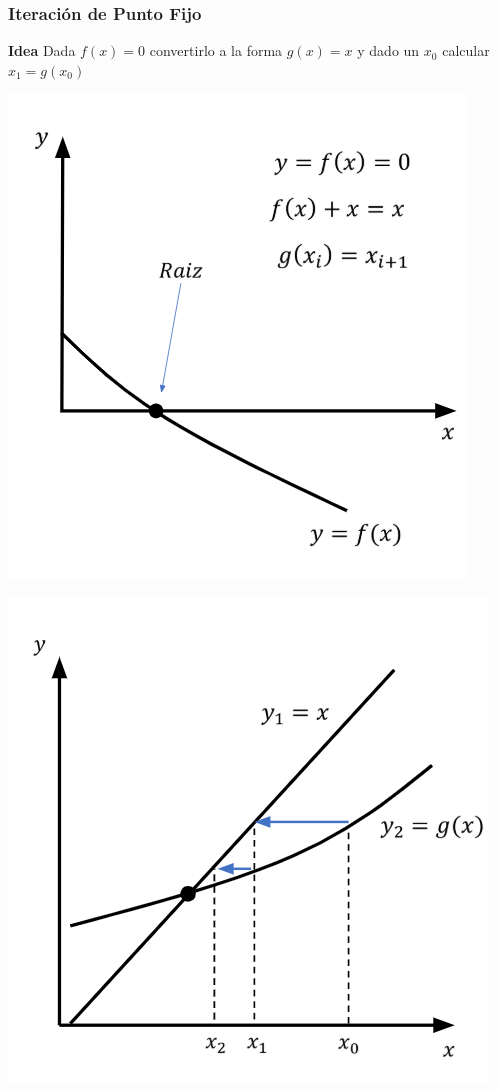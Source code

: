 \documentclass[xcolor=svgnames]{beamer} %
\theoremstyle{plain}
\renewcommand{\textbf}[1]{{\bfseries\textcolor{redUnq2}{#1}}}
\theoremstyle{definition}
\begin{document}
\begin{frame}
\frametitle{Iteración de Punto Fijo}

\begin{tcolorbox}
\textbf{Idea}
	Dada $f(x)=0$ convertirlo a la forma $g(x) = x$ y dado un $x_0$
	calcular $x_1 = g(x_0)$

\end{tcolorbox}
\begin{minipage}{.45\linewidth}
\includegraphics[width=\linewidth]{FixedPoint/fixed1.PNG} 

\end{minipage}  \begin{minipage}{.45\linewidth}
\includegraphics[width=\linewidth]{FixedPoint/fixed2.PNG} 


\end{minipage}
\end{frame}
\end{document}
